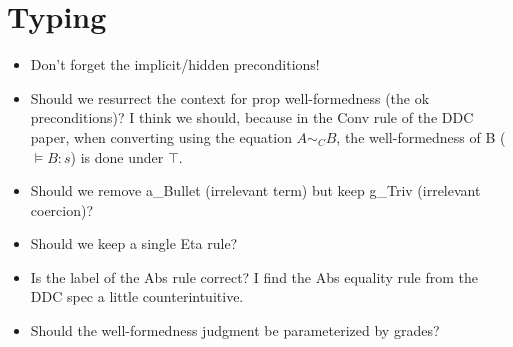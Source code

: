 \documentclass{article}
\begin{document}
\section{Typing}
\begin{itemize}
\item Don't forget the implicit/hidden preconditions!
\end{itemize}
\begin{itemize}
\item Should we resurrect the context for prop well-formedness (the ok
  preconditions)? I think we should, because in the Conv rule of the
  DDC paper, when converting using the equation $A \sim_C B$, the
  well-formedness of B ($\vDash B : s$) is done under $\top$.
\end{itemize}
\begin{itemize}
\item Should we remove a\_Bullet (irrelevant term) but keep g\_Triv (irrelevant coercion)?
\item Should we keep a single Eta rule?
\item Is the label of the Abs rule correct? I find the Abs equality rule from the DDC spec a little counterintuitive.
\end{itemize}
\begin{itemize}
\item Should the well-formedness judgment be parameterized by grades?
\end{itemize}
\end{document}
